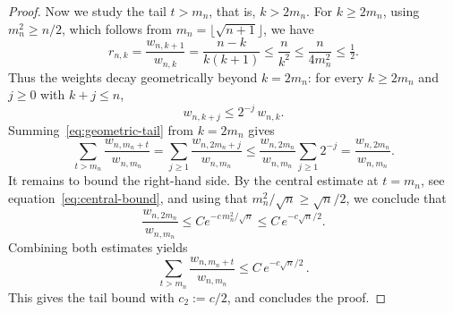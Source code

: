 \documentclass[english,11pt]{smfart}
\numberwithin{equation}{section}
\begin{document}
\begin{proof}
Now we study the tail $t>m_n$, that is, $k>2m_n$. For $k\ge 2m_n$, using
$m_n^2\ge n/2$, which follows from $m_n=\lfloor\sqrt{n+1}\rfloor$, we have
\[
  r_{n,k}
  = \frac{w_{n,k+1}}{w_{n,k}}
  = \frac{n-k}{k(k+1)}
  \le\frac{n}{k^2}
  \le\frac{n}{4m_n^2}
  \le\tfrac12 .
\]
Thus the weights decay geometrically beyond $k=2m_n$: for every $k\ge 2m_n$ and
$j\ge0$ with $k+j\le n$,
\begin{equation}\label{eq:geometric-tail}
  w_{n,k+j}\le 2^{-j}\,w_{n,k}.
\end{equation}
Summing~\eqref{eq:geometric-tail} from $k=2m_n$ gives
\[
  \sum_{t>m_n}\frac{w_{n,m_n+t}}{w_{n,m_n}}
  =\sum_{j\ge1}\frac{w_{n,2m_n+j}}{w_{n,m_n}}
  \le\frac{w_{n,2m_n}}{w_{n,m_n}}\sum_{j\ge1}2^{-j}
  =\frac{w_{n,2m_n}}{w_{n,m_n}} .
\]
It remains to bound the right-hand side. By the central estimate at $t=m_n$,
see equation~\eqref{eq:central-bound}, and using that
$m_n^2/\sqrt n\ge\sqrt n/2$, we conclude that
\[
  \frac{w_{n,2m_n}}{w_{n,m_n}}\le Ce^{-c\,{m_n^2}/{\sqrt n}}
  \le C\,e^{-c\sqrt n/2}.
\]
Combining both estimates yields
\[
  \sum_{t>m_n}\frac{w_{n,m_n+t}}{w_{n,m_n}}\le C\,e^{-c\sqrt n/2}\,.
\]
This gives the tail bound with $c_2:=c/2$, and concludes the proof.
\end{proof}
\end{document}
